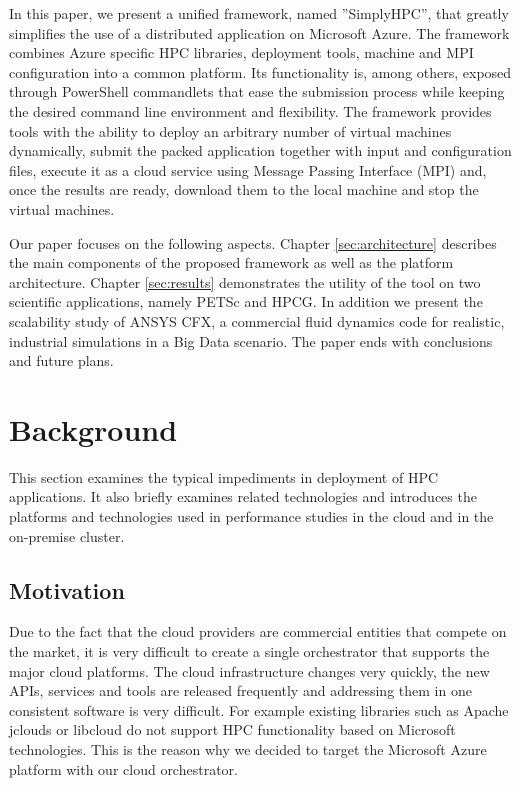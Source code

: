\documentclass[3p,times]{elsarticle}
\begin{document}
In this paper, we present a unified framework, named ''SimplyHPC'',  that greatly simplifies the use of a distributed application on Microsoft Azure. The framework combines Azure specific HPC libraries, deployment tools, machine and MPI configuration into a common platform. Its functionality is, among others, exposed through PowerShell commandlets that ease the submission process while keeping the desired command line environment and flexibility. The framework provides tools with the ability to deploy an arbitrary number of virtual machines dynamically, submit the packed application together with input and configuration files, execute it as a cloud service using Message Passing Interface (MPI) and, once the results are ready, download them to the local machine and stop the virtual machines. 

Our paper focuses on the following aspects. Chapter \ref{sec:architecture} describes the main components of the proposed framework as well as the platform architecture. Chapter \ref{sec:results} demonstrates the utility of the tool on two scientific applications, namely PETSc and HPCG. In addition we present the scalability study of ANSYS CFX, a commercial fluid dynamics code for realistic, industrial simulations in a Big Data scenario. The paper ends with conclusions and future plans.

\section{Background}
\label{sec:background}

This section examines the typical impediments in deployment of HPC applications. It also briefly examines related technologies and introduces the platforms and technologies used in performance studies in the cloud and in the on-premise cluster. 

\subsection{Motivation}
Due to the fact that the cloud providers are commercial entities that compete on the market, it is very difficult to create a single orchestrator that supports the major cloud platforms. The cloud infrastructure changes very quickly, the new APIs, services and tools are released frequently and addressing them in one consistent software is very difficult. For example existing libraries such as Apache jclouds \cite{jclouds} or libcloud \cite{libcloud} do not support HPC functionality based on Microsoft technologies. This is the reason why we decided to target the Microsoft Azure platform with our cloud orchestrator. 
\end{document}
